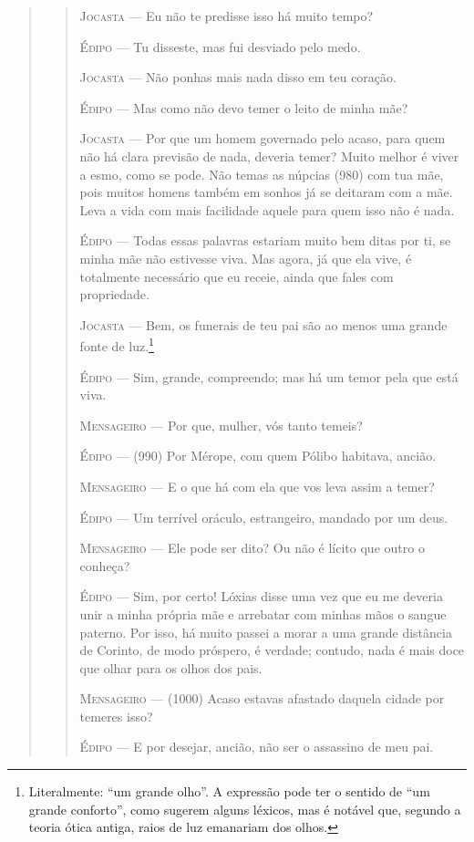 \begin{verse}
\begin{verse}
\textsc{Jocasta} --- Eu não te predisse isso há muito tempo?

\textsc{Édipo} --- Tu disseste, mas fui desviado pelo medo.

\textsc{Jocasta} --- Não ponhas mais nada disso em teu coração.

\textsc{Édipo} --- Mas como não devo temer o leito de minha mãe?

\textsc{Jocasta} --- Por que um homem governado pelo acaso, para quem não há clara previsão
de nada, deveria temer? Muito melhor é viver a esmo, como se pode. Não
temas as núpcias (980) com tua mãe, pois muitos homens também em sonhos
já se deitaram com a mãe. Leva a vida com mais facilidade aquele para
quem isso não é nada.

\textsc{Édipo} --- Todas essas palavras estariam muito bem ditas por ti, se minha mãe não
estivesse viva. Mas agora, já que ela vive, é totalmente necessário que
eu receie, ainda que fales com propriedade.

\textsc{Jocasta} --- Bem, os funerais de teu pai são ao menos uma grande fonte de
luz.\footnote{Literalmente: ``um grande olho''. A expressão pode ter o
  sentido de ``um grande conforto'', como sugerem alguns léxicos, mas é
  notável que, segundo a teoria ótica antiga, raios de luz emanariam dos
  olhos.}

\textsc{Édipo} --- Sim, grande, compreendo; mas há um temor pela que está viva.

\textsc{Mensageiro} --- Por que, mulher, vós tanto temeis?

\textsc{Édipo} --- (990) Por Mérope, com quem Pólibo habitava, ancião.

\textsc{Mensageiro} --- E o que há com ela que vos leva assim a temer?

\textsc{Édipo} --- Um terrível oráculo, estrangeiro, mandado por um deus.

\textsc{Mensageiro} --- Ele pode ser dito? Ou não é lícito que outro o conheça?

\textsc{Édipo} --- Sim, por certo! Lóxias disse uma vez que eu me deveria unir a minha
própria mãe e arrebatar com minhas mãos o sangue paterno. Por isso, há
muito passei a morar a uma grande distância de Corinto, de modo
próspero, é verdade; contudo, nada é mais doce que olhar para os olhos
dos pais.

\textsc{Mensageiro} --- (1000) Acaso estavas afastado daquela cidade por temeres isso?

\textsc{Édipo} --- E por desejar, ancião, não ser o assassino de meu pai.


\end{verse}
\end{verse}
